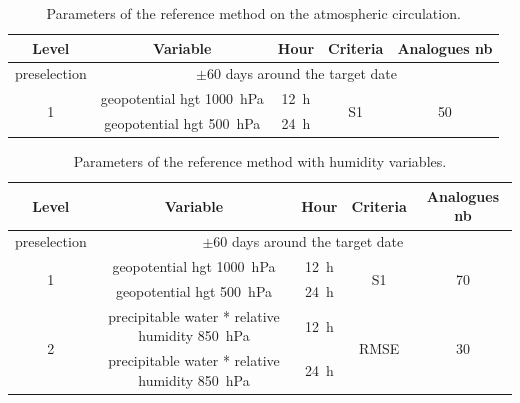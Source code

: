 \documentclass[twocol]{ametsoc}
\begin{document}
\begin{table}[htbp]
	\footnotesize
	\caption{Parameters of the reference method on the atmospheric circulation.}
	\begin{center}
		\begin{tabular}{ccccc}
			\hline \textbf{Level} & \textbf{Variable} & \textbf{Hour} & \textbf{Criteria} & \textbf{Analogues nb} \\ 
			\hline 
			preselection & \multicolumn{4}{c}{$\pm 60$ days around the target date} \\
			\hline 
			\multirow{2}{*}{1} & geopotential hgt 1000~hPa & 12~h & \multirow{2}{*}{S1} & \multirow{2}{*}{50} \\
			& geopotential hgt 500~hPa & 24~h & & \\ 
			\hline 
		\end{tabular} 
	\end{center}
	\label{table_params_R1}
\end{table}


\begin{table}[htbp]
	\footnotesize
	\caption{Parameters of the reference method with humidity variables.}
	\begin{center}
		\begin{tabular}{ccccc}
			\hline \textbf{Level} & \textbf{Variable} & \textbf{Hour} & \textbf{Criteria} & \textbf{Analogues nb} \\ 
			\hline 
			preselection & \multicolumn{4}{c}{$\pm 60$ days around the target date} \\
			\hline 
			\multirow{2}{*}{1} & geopotential hgt 1000~hPa & 12~h & \multirow{2}{*}{S1} & \multirow{2}{*}{70} \\
			& geopotential hgt 500~hPa & 24~h & & \\ 
			\hline
			\multirow{2}{*}{2} & precipitable water * relative humidity 850~hPa & 12~h & \multirow{2}{*}{RMSE} & \multirow{2}{*}{30} \\
			& precipitable water * relative humidity 850~hPa & 24~h & & \\ 
			\hline 
		\end{tabular} 
	\end{center}
	\label{table_params_R2}
\end{table}


%
\end{document}
